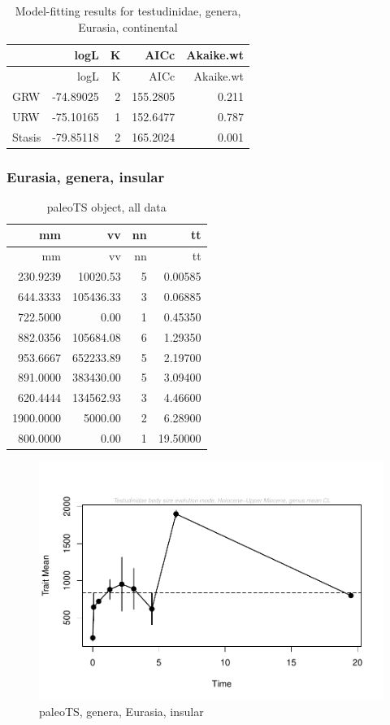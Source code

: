 \begin{longtable}[]{@{}lrrrr@{}}
	\caption{Model-fitting results for testudinidae, genera, Eurasia,
		continental}
	\label{tab:pTSEsC}
	\tabularnewline
	\toprule
	& logL & K & AICc & Akaike.wt\tabularnewline
	\midrule
	\endfirsthead
	\toprule
	& logL & K & AICc & Akaike.wt\tabularnewline
	\midrule
	\endhead
	GRW & -74.89025 & 2 & 155.2805 & 0.211\tabularnewline
	URW & -75.10165 & 1 & 152.6477 & 0.787\tabularnewline
	Stasis & -79.85118 & 2 & 165.2024 & 0.001\tabularnewline
	\bottomrule
\end{longtable}


\FloatBarrier

\subsubsection*{Eurasia, genera,
	insular}\label{eurasiagenera-insular}

\begin{longtable}[]{@{}rrrr@{}}
	\caption{paleoTS object, all data}\tabularnewline
	\toprule
	mm & vv & nn & tt\tabularnewline
	\midrule
	\endfirsthead
	\toprule
	mm & vv & nn & tt\tabularnewline
	\midrule
	\endhead
	230.9239 & 10020.53 & 5 & 0.00585\tabularnewline
	644.3333 & 105436.33 & 3 & 0.06885\tabularnewline
	722.5000 & 0.00 & 1 & 0.45350\tabularnewline
	882.0356 & 105684.08 & 6 & 1.29350\tabularnewline
	953.6667 & 652233.89 & 5 & 2.19700\tabularnewline
	891.0000 & 383430.00 & 5 & 3.09400\tabularnewline
	620.4444 & 134562.93 & 3 & 4.46600\tabularnewline
	1900.0000 & 5000.00 & 2 & 6.28900\tabularnewline
	800.0000 & 0.00 & 1 & 19.50000\tabularnewline
	\bottomrule
\end{longtable}

\newpage

\begin{figure}[H]
	\centering
	\includegraphics{MA_JJ_files/figure-latex/pTSEsI-1.pdf}
	\caption{paleoTS, genera, Eurasia, insular}
	\label{fig:pTSEsI}
\end{figure}

